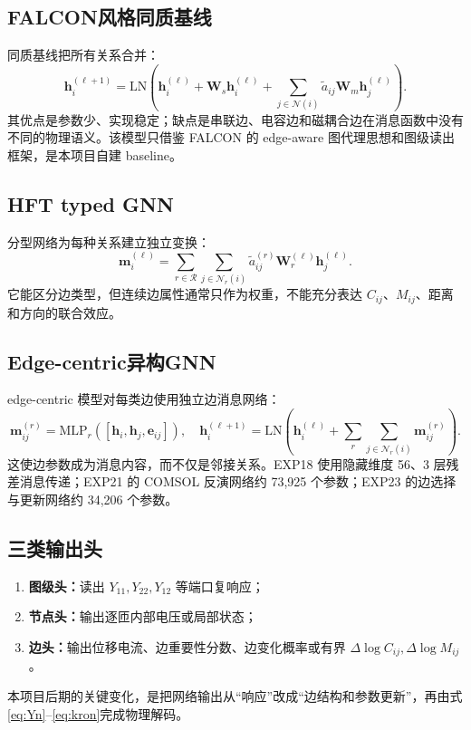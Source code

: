 \documentclass[UTF8,11pt,a4paper]{ctexart}
\newcommand{\mat}[1]{\bm{#1}}
\newcommand{\vect}[1]{\bm{#1}}
\begin{document}
\subsection{FALCON风格同质基线}
同质基线把所有关系合并：
\begin{equation}
\vect h_i^{(\ell+1)}=\mathrm{LN}\!\left(\vect h_i^{(\ell)}+
\mat W_s\vect h_i^{(\ell)}+
\sum_{j\in\mathcal N(i)}\widetilde a_{ij}\mat W_m\vect h_j^{(\ell)}\right).
\end{equation}
其优点是参数少、实现稳定；缺点是串联边、电容边和磁耦合边在消息函数中没有不同的物理语义。该模型只借鉴 FALCON 的 edge-aware 图代理思想和图级读出框架，是本项目自建 baseline。

\subsection{HFT typed GNN}
分型网络为每种关系建立独立变换：
\begin{equation}
\vect m_i^{(\ell)}=\sum_{r\in\mathcal R}\sum_{j\in\mathcal N_r(i)}
\widetilde a_{ij}^{(r)}\mat W_r^{(\ell)}\vect h_j^{(\ell)}.
\end{equation}
它能区分边类型，但连续边属性通常只作为权重，不能充分表达 $C_{ij}$、$M_{ij}$、距离和方向的联合效应。

\subsection{Edge-centric异构GNN}
edge-centric 模型对每类边使用独立边消息网络：
\begin{equation}
\vect m_{ij}^{(r)}=\mathrm{MLP}_r\left([\vect h_i,\vect h_j,\vect e_{ij}]\right),
\quad
\vect h_i^{(\ell+1)}=\mathrm{LN}\left(\vect h_i^{(\ell)}+
\sum_r\sum_{j\in\mathcal N_r(i)}\vect m_{ij}^{(r)}\right).
\end{equation}
这使边参数成为消息内容，而不仅是邻接关系。EXP18 使用隐藏维度 56、3 层残差消息传递；EXP21 的 COMSOL 反演网络约 73,925 个参数；EXP23 的边选择与更新网络约 34,206 个参数。

\subsection{三类输出头}
\begin{enumerate}
  \item \textbf{图级头：}读出 $Y_{11},Y_{22},Y_{12}$ 等端口复响应；
  \item \textbf{节点头：}输出逐匝内部电压或局部状态；
  \item \textbf{边头：}输出位移电流、边重要性分数、边变化概率或有界 $\Delta\log C_{ij},\Delta\log M_{ij}$。
\end{enumerate}
本项目后期的关键变化，是把网络输出从“响应”改成“边结构和参数更新”，再由式\eqref{eq:Yn}--\eqref{eq:kron}完成物理解码。
\end{document}
